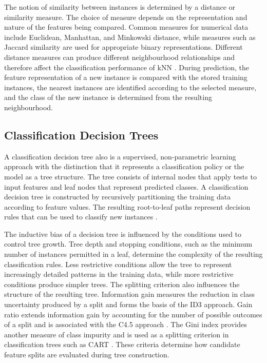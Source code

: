 \documentclass[conference, 10pt]{IEEEtran}
\begin{document}
The notion of similarity between instances is determined by a distance or similarity measure. 
The choice of measure depends on the representation and nature of the features being compared. 
Common measures for numerical data include Euclidean, Manhattan, and Minkowski distance, while 
measures such as Jaccard similarity are used for appropriate binary representations. Different 
distance measures can produce different neighbourhood relationships and therefore affect the 
classification performance of kNN \cite{AbuAlfeilat2019}. During prediction, the feature representation 
of a new instance is compared with the stored training instances, the nearest instances are identified 
according to the selected measure, and the class of the new instance is determined from the 
resulting neighbourhood.

\subsection{Classification Decision Trees}

A classification decision tree also is a supervised, non-parametric learning approach with the 
distinction that it represents a classification policy or the model as a tree structure. The 
tree consists of internal nodes that apply tests to input features and leaf nodes that represent 
predicted classes. A classification decision tree is constructed by recursively partitioning the 
training data  according to feature values. The resulting root-to-leaf paths represent decision 
rules that can be used to classify new instances \cite{Singh2014}.

The inductive bias of a decision tree is influenced by the conditions used to control tree growth. 
Tree depth and stopping conditions, such as the minimum number of instances permitted in a leaf, 
determine the complexity of the resulting classification rules. Less restrictive conditions allow 
the tree to represent increasingly detailed patterns in the training data, while more restrictive 
conditions produce simpler trees. The splitting criterion also influences the structure of the 
resulting tree. Information gain measures the reduction in class uncertainty produced by a split 
and forms the basis of the ID3 approach. Gain ratio extends information gain by accounting for the 
number of possible outcomes of a split and is associated with the C4.5 approach \cite{Singh2014}. 
The Gini index provides another measure of class impurity and is used as a splitting criterion in 
classification trees such as CART \cite{SivagamaSundhari2011}. These criteria determine how candidate 
feature splits are evaluated during tree construction.
\end{document}
